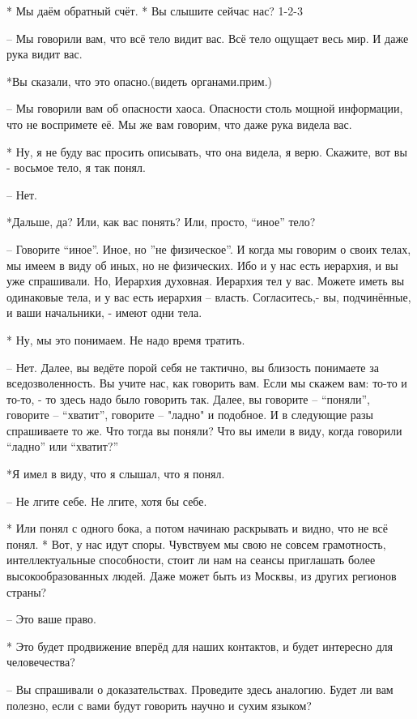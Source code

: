  * Мы даём обратный счёт.
 * Вы слышите сейчас нас? 
 1-2-3

 – Мы говорили вам, что всё тело видит вас. Всё тело ощущает весь мир. И даже рука видит вас.

 *Вы  сказали, что это опасно.(видеть органами.прим.)

 – Мы говорили вам об опасности хаоса. Опасности столь мощной информации, что не воспримете её. Мы же вам говорим, что даже рука видела вас.

 * Ну, я не буду вас просить описывать, что она видела, я верю. Скажите, вот вы - восьмое тело, я так понял.

 – Нет.

 *Дальше, да? Или, как вас понять? Или, просто, “иное” тело?

 – Говорите “иное”. Иное, но ”не физическое”. И когда мы говорим о своих телах, мы имеем в виду об иных, но не физических. Ибо и у нас есть иерархия, и вы уже спрашивали. Но, Иерархия духовная. Иерархия тел у вас. Можете иметь вы одинаковые тела, и у вас есть иерархия – власть. Согласитесь,-  вы, подчинённые, и ваши начальники, - имеют одни тела.

 * Ну, мы это понимаем. Не надо время тратить.

 – Нет. Далее, вы ведёте порой себя не тактично, вы близость понимаете за  вседозволенность. Вы учите нас, как говорить вам. Если мы скажем вам: то-то и то-то, - то здесь надо было говорить так. Далее, вы говорите – “поняли”, говорите – “хватит”, говорите – "ладно" и подобное. И в следующие разы спрашиваете то же. Что тогда вы поняли? Что вы имели в виду, когда говорили  “ладно” или “хватит?”

 *Я имел в виду, что я слышал, что я понял.

 – Не лгите себе. Не лгите, хотя бы себе.

 * Или понял с одного бока, а потом начинаю раскрывать и видно, что не всё понял.
 * Вот, у нас идут споры. Чувствуем мы свою не совсем грамотность, интеллектуальные способности, стоит ли нам на сеансы приглашать более высокообразованных людей. Даже может быть из Москвы, из других регионов страны?

 – Это ваше право.

 * Это будет продвижение вперёд для наших контактов, и будет интересно для человечества?

 – Вы спрашивали о доказательствах. Проведите здесь аналогию. Будет ли вам полезно, если с вами будут говорить научно и сухим языком?

